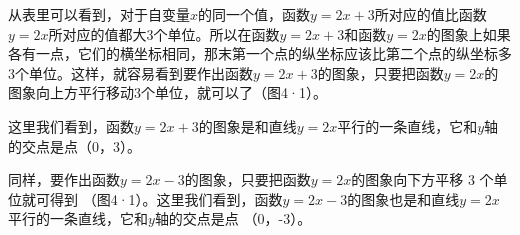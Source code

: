 {\centering
\footnotesize\setlength{\tabcolsep}{2.6pt}%
\par
}

从表里可以看到，对于自变量\(x\)的同一个值，函数\(y = 2x + 3\)所对应的值比函数\(y = 2x\)所对应的值都大3个单位。所以在函数\(y = 2x + 3\)和函数\(y = 2x\)的图象上如果各有一点，它们的横坐标相同，那末第一个点的纵坐标应该比第二个点的纵坐标多3个单位。这样，就容易看到要作出函数\(y = 2x + 3\)的图象，只要把函数\(y = 2x\)的图象向上方平行移动3个单位，就可以了（图4·1）。

这里我们看到，函数\(y = 2x + 3\)的图象是和直线\(y = 2x\)平行的一条直线，它和\(y\)轴的交点是点（0，3）。

同样，要作出函数\(y = 2x - 3\)的图象，只要把函数\(y = 2x\)的图象向下方平移
3 个单位就可得到 （图4·1）。这里我们看到，函数\(y = 2x - 3\)的图象也是和直线\(y = 2x\)平行的一条直线，它和\(y\)轴的交点是点
（0，-3）。

